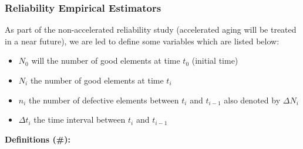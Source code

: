 	\pagebreak
	\subsubsection{Reliability Empirical Estimators}
	As part of the non-accelerated reliability study (accelerated aging will be treated in a near future), we are led to define some variables which are listed below:
	\begin{itemize}
		\item $N_0$ will the number of good elements at time $t_0$ (initial time)
		\item $N_i$ the number of good elements at time $t_i$
		\item $n_i$ the number of defective elements between $t_i$ and $t_{i-1}$ also denoted  by $\Delta N_i$
		\item $\Delta t_i$ the time interval between $t_i$ and $t_{i-1}$
	\end{itemize}
	\textbf{Definitions (\#\mydef):}
